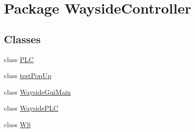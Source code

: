 \hypertarget{namespaceWaysideController}{}\section{Package Wayside\+Controller}
\label{namespaceWaysideController}
\subsection*{Classes}
\begin{DoxyCompactItemize}
\item 
class \hyperlink{classWaysideController_1_1PLC}{P\+LC}
\item 
class \hyperlink{classWaysideController_1_1testPopUp}{test\+Pop\+Up}
\item 
class \hyperlink{classWaysideController_1_1WaysideGuiMain}{Wayside\+Gui\+Main}
\item 
class \hyperlink{classWaysideController_1_1WaysidePLC}{Wayside\+P\+LC}
\item 
class \hyperlink{classWaysideController_1_1WS}{WS}
\end{DoxyCompactItemize}
